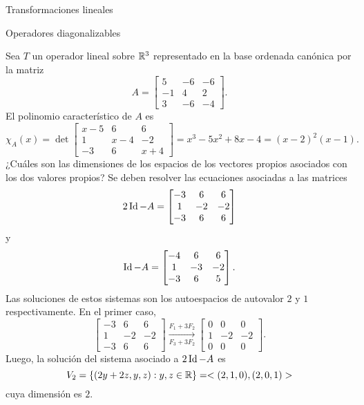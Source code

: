 \begin{chapter}{Transformaciones lineales}
\begin{section}{Operadores diagonalizables}
        \begin{ejemplo*}
            Sea $T$ un operador lineal sobre $\mathbb R^3$  representado en la base ordenada canónica por la matriz
            \begin{equation*}
                A = 
                \begin{bmatrix}
                5 &-6 &-6\\ -1& 4& 2\\3 &-6& -4
                \end{bmatrix}.
            \end{equation*}
            El  polinomio característico de $A$ es
            \begin{equation*}
                \chi_A(x) = \det \begin{bmatrix}
                    x-5 &6 &6\\ 1& x-4& -2\\-3 &6& x+4
                \end{bmatrix} 
                = x^3 - 5 x^2 + 8 x - 4 = (x-2)^2(x-1).
            \end{equation*}
            ¿Cuáles son las dimensiones de los espacios de los vectores propios asociados con los dos valores propios? Se deben resolver las ecuaciones asociadas a las matrices
            \begin{equation*}
            2 \operatorname{Id} -A = 
            \begin{bmatrix}
            -3 &6 &6\\ 1& -2& -2\\-3 &6& 6
            \end{bmatrix} 
            \end{equation*}
            y 
            \begin{equation*}
            \operatorname{Id}-A= 
            \begin{bmatrix}
            -4 &6 &6\\ 1& -3& -2\\-3 &6& 5
            \end{bmatrix}.
            \end{equation*}
            Las soluciones de estos sistemas son los autoespacios de autovalor $2$ y $1$ respectivamente. En  el primer caso, 
            \begin{equation*}
            \begin{bmatrix} -3 &6 &6\\ 1& -2& -2\\-3 &6& 6 \end{bmatrix}
            \underset{F_3+3F_2}{\stackrel{F_1+3 F_2}{\longrightarrow}} 
            \begin{bmatrix} 0 &0 &0\\ 1& -2& -2\\0 &0& 0 \end{bmatrix}.
            \end{equation*}
            Luego,  la solución del sistema asociado a $2\operatorname{Id}-A$ es 
            $$
            V_2 = \{(2y+2z,y,z): y,z \in \mathbb R\} = <(2,1,0),(2,0,1)>
            $$
            cuya dimensión es $2$. 
            

\end{ejemplo*}
\end{section}
\end{chapter}
